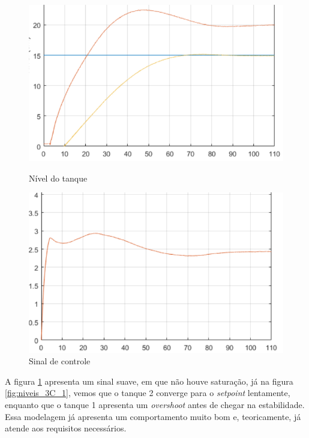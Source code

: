 \documentclass[
	12pt,				%
	openany,			%
	oneside,			%
	a4paper,			%
	english,			%
	french,				%
	spanish,			%
	brazil,				%
	]{abntex2}
\begin{document}
{\begin{figure}[h]
	\centering
	\begin{minipage}{.5\textwidth}
		\centering
		\includegraphics[scale=0.45]{imagens/3C_1_niveis.png}
		\caption{Nível do tanque}
		\label{fig:niveis_3C_1}		
	\end{minipage}
	\begin{minipage}{.5\textwidth}
		\centering
		\includegraphics[scale=0.45]{imagens/3C_1_sinal_controle.png}
		\caption{Sinal de controle}
		\label{fig:sinal_3C_1}		
	\end{minipage}
\end{figure}

A figura \ref{fig:sinal_3C_1} apresenta um sinal suave, em que não houve saturação, já na figura \ref{fig:niveis_3C_1}, vemos que o tanque 2 converge para o \textit{setpoint} lentamente, enquanto que o tanque 1 apresenta um \textit{overshoot} antes de chegar na estabilidade. Essa modelagem já apresenta um comportamento muito bom e, teoricamente, já atende aos requisitos necessários.

}
\end{document}
